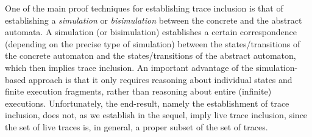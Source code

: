 \documentclass[11pt]{article}
\begin{document}
One of the main proof techniques for establishing trace inclusion is
that of establishing a \textit{simulation} \cite{LV95} or
\emph{bisimulation} \cite{Mil99} between the concrete and the abstract
automata.  A simulation (or bisimulation) establishes a certain
correspondence (depending on the precise type of simulation)
between the states/transitions of the concrete automaton and
the states/transitions of the abstract automaton, which then implies trace
inclusion.
An important advantage of the simulation-based approach is that it
only requires reasoning about individual states and finite execution
fragments, rather
than reasoning about entire (infinite) executions.  Unfortunately, the
end-result, namely the establishment of trace inclusion, does not, as
we establish in the sequel, imply live trace inclusion, since 
the set of live traces is, in general, a proper subset of the set of traces.
\end{document}
